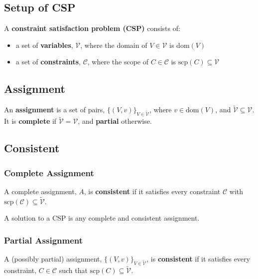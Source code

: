 \subsection{Setup of CSP}
\begin{definition}
    A \textbf{constraint satisfaction problem (CSP)} consists of:
    \begin{itemize}
        \item a set of \textbf{variables}, $\mathcal{V}$, where the domain of $V \in \mathcal{V}$ is $\text{dom}(V)$
        \item a set of \textbf{constraints}, $\mathcal{C}$, where the scope of $C \in \mathcal{C}$ is $\text{scp}(C) \subseteq \mathcal{V}$
    \end{itemize}
\end{definition}

\subsection{Assignment}
\begin{definition}
    An \textbf{assignment} is a set of pairs, \(\{(V, v)\}_{V \in \tilde{\mathcal{V}}}\), where \(v \in \text{dom}(V)\), and \(\tilde{\mathcal{V}} \subseteq \mathcal{V}\). It is \textbf{complete} if \(\tilde{\mathcal{V}} = \mathcal{V}\), and \textbf{partial} otherwise.
\end{definition}

\subsection{Consistent}
\subsubsection{Complete Assignment}
\begin{definition}
    A complete assignment, \(A\), is \textbf{consistent} if it satisfies every constraint \(\mathcal{C}\) with \(\text{scp}(\mathcal{C}) \subseteq \tilde{\mathcal{V}}\).
\end{definition}

\begin{warning}
    A solution to a CSP is any complete and consistent assignment.
\end{warning}

\subsubsection{Partial Assignment}
\begin{definition}
    A (possibly partial) assignment, \(\{(V, v)\}_{V \in \tilde{\mathcal{V}}}\), is \textbf{consistent} if it satisfies every constraint, \(C \in \mathcal{C}\) such that \(\text{scp}(C) \subseteq \tilde{\mathcal{V}}\).
\end{definition}

